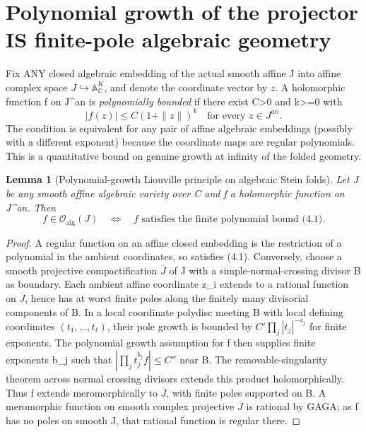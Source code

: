 \documentclass[11pt]{article}
\newtheorem{lemma}[theorem]{Lemma}
\begin{document}
\section{Polynomial growth of the projector IS finite-pole algebraic geometry}
Fix ANY closed algebraic embedding of the actual
smooth affine J into affine complex space
$J\hookrightarrow\mathbb A_{\mathbb C}^K$,
and denote the coordinate vector by $z$.
A holomorphic function f on J^{an} is
\emph{polynomially bounded} if
there exist C>0 and k>=0 with
\[
 \boxed{|f(z)|\le C(1+\|z\|)^k\quad
                       \text{for every }z\in J^{an}.}     \tag{4.1}
\]
The condition is equivalent for any pair
of affine algebraic embeddings (possibly
with a different exponent) because the
coordinate maps are regular polynomials.
This is a quantitative bound on genuine
growth at infinity of the folded geometry.

\begin{lemma}[Polynomial-growth Liouville principle on algebraic Stein folds]
Let J be any smooth affine algebraic variety
over C and f a holomorphic function on J^{an}.
Then
\[
 \boxed{
 f\in\mathcal O_{\mathrm{alg}}(J)
 \quad\Longleftrightarrow\quad
 f\text{ satisfies the finite polynomial bound (4.1)}.
 }                                                       \tag{4.2}
\]
\end{lemma}
\begin{proof}
A regular function on an affine closed embedding
is the restriction of a polynomial in the ambient
coordinates, so satisfies (4.1). Conversely,
choose a smooth projective compactification
$\overline J$ of J with a simple-normal-crossing
divisor B as boundary. Each ambient affine
coordinate z_i extends to a rational function
on $\overline J$, hence has at worst finite
poles along the finitely many divisorial
components of B. In a local coordinate
polydisc meeting B with local defining
coordinates $(t_1,\dots,t_\ell)$, their
pole growth is bounded by
$C'\prod_j|t_j|^{-a_j}$ for finite exponents.
The polynomial growth assumption for f
then supplies finite exponents b_j such that
$|\prod_j t_j^{b_j}f|\le C''$ near B.
The removable-singularity theorem across
normal crossing divisors extends this
product holomorphically. Thus f extends
meromorphically to $\overline J$, with
finite poles supported on B. A meromorphic
function on smooth complex projective
$\overline J$ is rational by GAGA;
as f has no poles on smooth J, that
rational function is regular there.
\end{proof}
\end{document}
